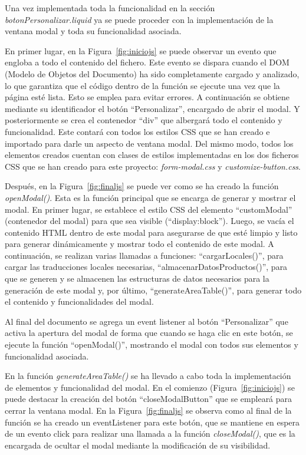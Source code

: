 \documentclass[11pt]{article}
\begin{document}
Una vez implementada toda la funcionalidad en la sección \textit{botonPersonalizar.liquid} ya se puede proceder con la implementación de la ventana
modal y toda su funcionalidad asociada.

En primer lugar, en la Figura~\ref{fig:iniciojs} se puede observar un evento que engloba a todo el contenido del fichero. Este evento se dispara cuando el DOM (Modelo de Objetos del Documento) ha 
sido completamente cargado y analizado, lo que garantiza que el código dentro de la función se ejecute una vez que la página esté lista. Esto se emplea para evitar errores.
A continuación se obtiene mediante su identificador el botón ``Personalizar'', encargado de abrir el modal. Y posteriormente se crea el contenedor ``div'' que albergará 
todo el contenido y funcionalidad. Este contará con todos los estilos CSS que se han creado e importado para darle un aspecto de ventana modal. Del mismo modo, todos los elementos
creados cuentan con clases de estilos implementadas en los dos ficheros CSS que se han creado para este proyecto: \textit{form-modal.css} y \textit{customize-button.css}.

Después, en la Figura~\ref{fig:finaljs} se puede ver como se ha creado la función \textit{openModal()}. Esta es la función principal que se encarga
de generar y mostrar el modal. En primer lugar, se establece el estilo CSS del elemento ``customModal'' (contenedor del modal) para que sea visible (``display:block'').
Luego, se vacía el contenido HTML dentro de este modal para asegurarse de que esté limpio y listo para generar dinámicamente y mostrar todo el contenido de este modal.
A continuación, se realizan varias llamadas a funciones: ``cargarLocales()'', para cargar las traducciones locales necesarias, ``almacenarDatosProductos()'', para que se generen
y se almacenen las estructuras de datos necesarios para la generación de este modal y, por último, ``generateAreaTable()'', para generar todo el contenido y funcionalidades
del modal. 

Al final del documento se agrega un event listener al botón ``Personalizar'' que activa la apertura del modal de forma que cuando se haga clic en este botón, se 
ejecute la función ``openModal()'', mostrando el modal con todos sus elementos y funcionalidad asociada.

En la función \textit{generateAreaTable()} se ha llevado a cabo toda la implementación de elementos y funcionalidad del modal. En el comienzo (Figura~\ref{fig:iniciojs}) se puede destacar la creación del botón
``closeModalButton'' que se empleará para cerrar la ventana modal. En la Figura~\ref{fig:finaljs} se observa como al final de la función se ha creado un eventListener para este botón, que se mantiene en espera de un evento
click para realizar una llamada a la función \textit{closeModal()}, que es la encargada de ocultar el modal mediante la modificación de su visibilidad.
\end{document}
